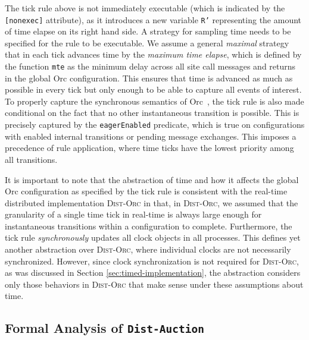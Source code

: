 \documentclass{eptcs}
\begin{document}
The tick rule above is not immediately executable (which is indicated by the \texttt{[nonexec]} attribute), as it introduces a new variable \texttt{R'} representing the amount of time elapse on its right hand side. A strategy for sampling time needs to be specified for the rule to be executable. We assume a general \emph{maximal} strategy that in each tick advances time by the \emph{maximum time elapse}, which is defined by the function \texttt{mte} as the minimum delay across all site call messages and returns in the global Orc configuration. This ensures that time is advanced as much as possible in every tick but only enough to be able to capture all events of interest. To properly capture the synchronous semantics of Orc~\cite{AlTurkiM07PPDP,AlTurkiM07WWV}, the tick rule is also made conditional on the fact that no other instantaneous transition is possible. This is precisely captured by the \texttt{eagerEnabled} predicate, which  is true on configurations with enabled internal transitions or pending message exchanges. This imposes a precedence of rule application, where time ticks have the lowest priority among all transitions. 


It is important to note that the abstraction of time and how it affects the global Orc configuration as specified by the tick rule is consistent with the real-time distributed implementation \textsc{Dist-Orc} in that, in \textsc{Dist-Orc}, we assumed that the granularity of a single time tick in real-time is always large enough for instantaneous transitions within a configuration to complete. Furthermore, the tick rule \emph{synchronously} updates all clock objects in all processes. This defines yet another abstraction over \textsc{Dist-Orc}, where individual clocks are not necessarily synchronized. However, since clock synchronization is not required for \textsc{Dist-Orc}, as was discussed in Section \ref{sec:timed-implementation}, the abstraction considers only those behaviors in \textsc{Dist-Orc} that make sense under these assumptions about time.




\subsection{Formal Analysis of \texttt{Dist-Auction}}
\end{document}
